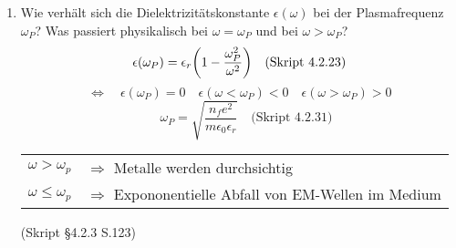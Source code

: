 \documentclass{scrartcl}
\newcommand{\ds}{\displaystyle}
\newcommand{\sref}[1]{(Skript #1)}
\newcommand{\smref}[1]{\quad\text{(Skript #1)}}
\begin{document}
\begin{enumerate}
    \item Wie verhält sich die Dielektrizitätskonstante $\epsilon(\omega)$
          bei der Plasmafrequenz $\omega_P$? Was passiert physikalisch bei
          $\omega=\omega_P$ und bei $\omega>\omega_P$?
          $$
          \epsilon(\omega_P)=\epsilon_r\qty(1-\frac{\omega_P^2}{\omega^2})
          \smref{4.2.23}$$
          $$\Leftrightarrow\quad\epsilon(\omega_P)=0
          \quad\epsilon(\omega<\omega_P)<0 
          \quad\epsilon(\omega>\omega_P)>0$$
          $$\quad\omega_P=\sqrt{\frac{n_fe^2}
          {m\epsilon_0\epsilon_r}}\smref{4.2.31}$$
          \begin{tabular}{rl}
            $\ds\omega>\omega_p$ &$\Rightarrow$ 
            Metalle werden durchsichtig\\
            $\ds\omega\le\omega_p$& $\Rightarrow$ Expononentielle 
            Abfall von EM-Wellen im Medium
          \end{tabular}
          \begin{center}
            \sref{§4.2.3 S.123}
          \end{center}

  \end{enumerate}
\end{document}
